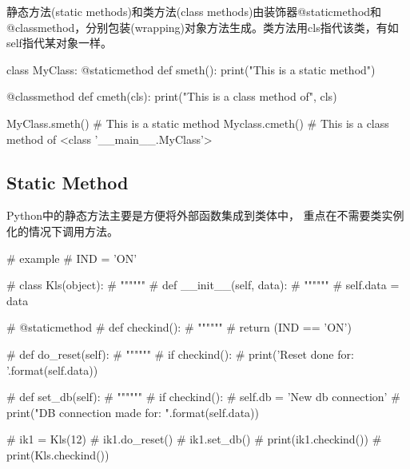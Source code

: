 静态方法(static methods)和类方法(class methods)由装饰器@staticmethod和@classmethod，分别包装(wrapping)对象方法生成。类方法用cls指代该类，有如self指代某对象一样。

\begin{python}
class MyClass:
    @staticmethod
    def smeth():
        print("This is a static method")

    @classmethod
    def cmeth(cls):
        print("This is a class method of", cls)

MyClass.smeth()
# This is a static method
Myclass.cmeth()
# This is a class method of <class '__main__.MyClass'>
\end{python}
\subsection{Static Method}
Python中的静态方法主要是方便将外部函数集成到类体中， 重点在不需要类实例化的情况下调用方法。
\begin{python}
# example
# IND = 'ON'

# class Kls(object):
#     """"""
#     def __init__(self, data):
#         """"""
#         self.data = data

#     @staticmethod
#     def checkind():
#         """"""
#         return (IND == 'ON')

#     def do_reset(self):
#         """"""
#         if checkind():
#             print('Reset done for: {}'.format(self.data))

#     def set_db(self):
#         """"""
#         if checkind():
#             self.db = 'New db connection'
#             print("DB connection made for: {}".format(self.data))

# ik1 = Kls(12)
# ik1.do_reset()
# ik1.set_db()
# print(ik1.checkind())
# print(Kls.checkind())
\end{python}


